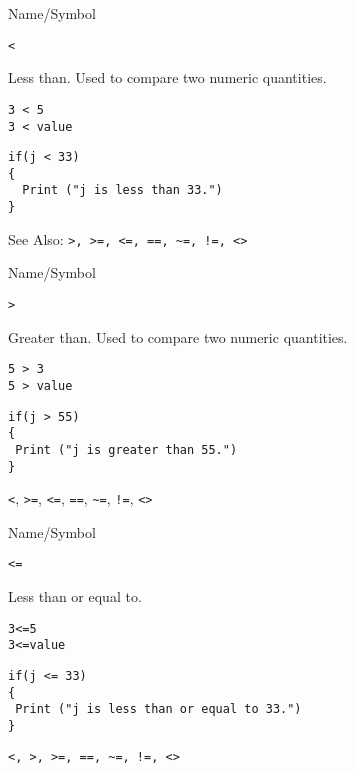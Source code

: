 \rl

\begin{desc}{Name/Symbol}

\item[Name/Symbol] 	\verb+<+ 

\item[Description] 	Less than.  Used to compare two numeric quantities.

\item[Usage]
\begin{verbatim}
3 < 5
3 < value
\end{verbatim}
             
\item[Example]
\begin{verbatim}
if(j < 33)
{
  Print ("j is less than 33.")
}
\end{verbatim}

See Also:     	\verb+>, >=, <=, ==, ~=, !=, <>+

\end{desc}

\rl



\begin{desc}{Name/Symbol}

\item[Name/Symbol] 	\verb!>!                    

\item[Description] 	Greater than. Used to compare two numeric quantities.

\item[Usage]
\begin{verbatim}
5 > 3
5 > value
\end{verbatim}

\item[Example]
\begin{verbatim}
if(j > 55)
{
 Print ("j is greater than 55.")
}
\end{verbatim}

\item[See Also]     	\verb+<+, \verb+>=+, \verb+<=+, \verb+==+, \verb+~=+, \verb+!=+, \verb+<>+
\end{desc}

\rl


\begin{desc}{Name/Symbol}

\item[Name/Symbol] 	\verb+<=+                   

\item[Description] 	Less than or equal to.

\item[Usage]
\begin{verbatim}
3<=5  
3<=value
\end{verbatim}

\item[Example]
\begin{verbatim}
if(j <= 33)
{
 Print ("j is less than or equal to 33.")
}
\end{verbatim}
	
\item[See Also]     	\verb+<, >, >=, ==, ~=, !=, <>+

\end{desc}

